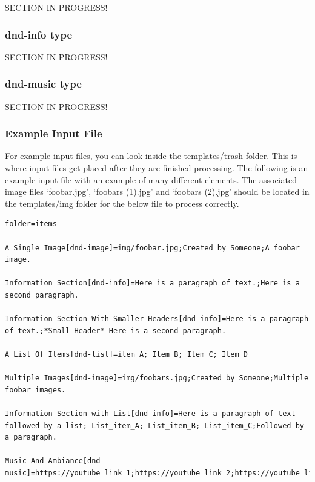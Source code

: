 SECTION IN PROGRESS!

\subsubsection{dnd-info type}

SECTION IN PROGRESS!

\subsubsection{dnd-music type}

SECTION IN PROGRESS!

\subsubsection{Example Input File}

For example input files, you can look inside the templates/trash folder. This is where input files get placed after they are finished processing. The following is an example input file with an example of many different elements. The associated image files `foobar.jpg', `foobars (1).jpg' and `foobars (2).jpg' should be located in the templates/img folder for the below file to process correctly.

\begin{lstlisting}
folder=items

A Single Image[dnd-image]=img/foobar.jpg;Created by Someone;A foobar image.

Information Section[dnd-info]=Here is a paragraph of text.;Here is a second paragraph.

Information Section With Smaller Headers[dnd-info]=Here is a paragraph of text.;*Small Header* Here is a second paragraph.

A List Of Items[dnd-list]=item A; Item B; Item C; Item D

Multiple Images[dnd-image]=img/foobars.jpg;Created by Someone;Multiple foobar images.

Information Section with List[dnd-info]=Here is a paragraph of text followed by a list;-List_item_A;-List_item_B;-List_item_C;Followed by a paragraph.

Music And Ambiance[dnd-music]=https://youtube_link_1;https://youtube_link_2;https://youtube_link_3
\end{lstlisting}

